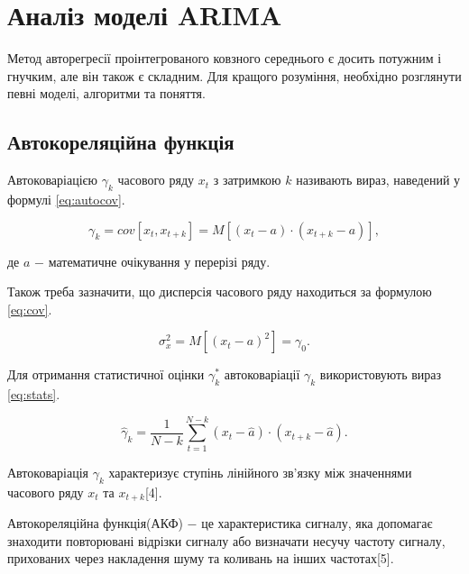 \section{Аналіз моделі ARIMA}
\label{sec:ARIMA}

Метод авторегресії проінтегрованого ковзного середнього є досить потужним і гнучким, але він також є складним. Для кращого розуміння, необхідно розглянути певні моделі, алгоритми та поняття.

\subsection{Автокореляційна функція}

Автоковаріацією $\gamma_{k}$ часового ряду $x_{t}$ з затримкою $k$ називають вираз, наведений у формулі \ref{eq:autocov}.

\begin{equation}\label{eq:autocov}
\gamma_{k} = cov[x_{t}, x_{t+k}] = M[(x_{t} - a) \cdot (x_{t+k} - a)],
\end{equation}

\noindent де $a$ $-$ математичне очікування у перерізі ряду.

Також треба зазначити, що дисперсія часового ряду находиться за формулою \ref{eq:cov}.

\begin{equation}\label{eq:cov}
\sigma^{2}_{x} = M[(x_{t} - a)^2] = \gamma_{0}.
\end{equation}

Для отримання статистичної оцінки $\gamma^{*}_{k}$ автоковаріації $\gamma_{k}$ використовують вираз \ref{eq:stats}.

\begin{equation}\label{eq:stats}
\hat{\gamma}_{k} = \frac{1}{N-k}\sum^{N-k}_{t=1}(x_{t} - \hat{a}) \cdot (x_{t+k} - \hat{a}).
\end{equation}

Автоковаріація $\gamma_{k}$ характеризує ступінь лінійного зв'язку між значеннями часового ряду $x_{t}$ та $x_{t+k}$[4].

Автокореляційна функція(АКФ) $-$ це характеристика сигналу, яка допомагає знаходити повторювані відрізки сигналу або визначати несучу частоту сигналу, прихованих через накладення шуму та коливань на інших частотах[5].

